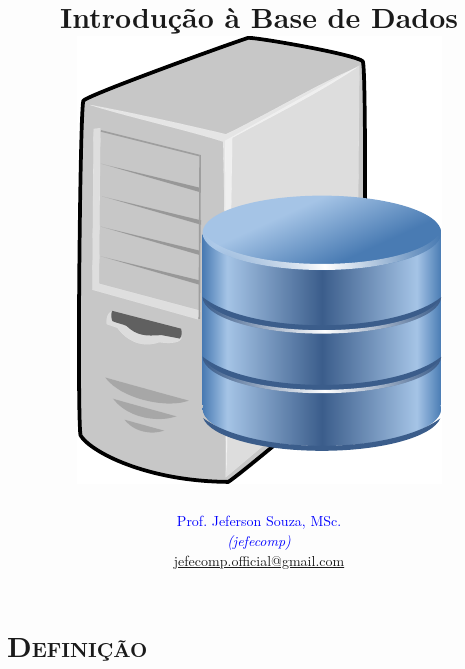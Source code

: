 \documentclass[xcolor=x11names,compress]{beamer}
\begin{document}
\title[Introdução à Base de Dados \hskip27mm \insertframenumber / \inserttotalframenumber  \hskip33.2mm \inserttitlegraphic ]{Introdução à Base de Dados \\[4mm]
\includegraphics[keepaspectratio,width=.25\textwidth]{database-server}}
\author[@2018 Jeferson Souza, MSc (jefecomp) - All rights reserved.]{
	\textcolor{blue}{Prof. Jeferson Souza, MSc.} \\[1mm] 
	\textcolor{blue}{\textit{{\footnotesize (jefecomp) }}}\\[1.5mm]
	 \underline{{\footnotesize jefecomp.official@gmail.com}}
	 \vspace*{1mm}
}

\date{}


\begin{frame}
\titlepage
\end{frame}

\section{\scshape Definição}
\end{document}
